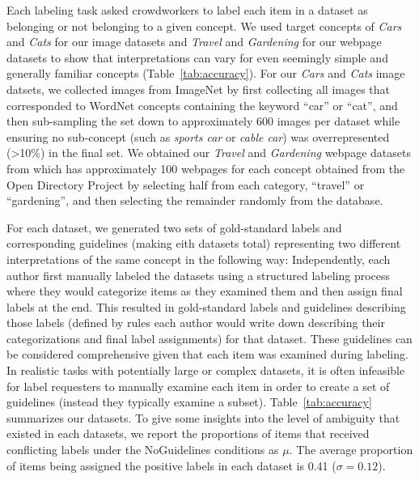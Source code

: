 Each labeling task asked crowdworkers to label each item in a dataset as belonging or not belonging to a given concept. We used target concepts of \emph{Cars} and \emph{Cats} for our image datasets and \emph{Travel} and \emph{Gardening} for our webpage datasets to show that interpretations can vary for even seemingly simple and generally familiar concepts (Table~\ref{tab:accuracy}). For our \emph{Cars} and \emph{Cats} image datsets, we collected images from ImageNet \cite{deng2009imagenet} by first collecting all images that corresponded to WordNet \cite{miller1995wordnet} concepts containing the keyword ``car'' or ``cat'', and then sub-sampling the set down to approximately 600 images per dataset while ensuring no sub-concept (such as \emph{sports car} or \emph{cable car}) was overrepresented (>10\%) in the final set. We obtained our \emph{Travel} and \emph{Gardening} webpage datasets from \cite{kulesza2014structured} which has approximately 100 webpages for each concept obtained from the Open Directory Project by selecting half from each category, ``travel'' or ``gardening'', and then selecting the remainder randomly from the database.

For each dataset, we generated two sets of gold-standard labels and corresponding guidelines (making eith datasets total) representing two different interpretations of the same concept in the following way: 
Independently, each author first manually labeled the datasets using a structured labeling process \cite{kulesza2014structured} where they would categorize items as they examined them and then assign final labels at the end. This resulted in gold-standard labels and guidelines describing those labels (defined by rules each author would write down describing their categorizations and final label assignments) for that dataset. These guidelines can be considered comprehensive given that each item was examined during labeling. In realistic tasks with potentially large or complex datasets, it is often infeasible for label requesters to manually examine each item in order to create a set of guidelines (instead they typically examine a subset). Table~\ref{tab:accuracy} summarizes our datasets. To give some insights into the level of ambiguity that existed in each datasets, we report the proportions of items that received conflicting labels under the NoGuidelines conditions as $\mu$. The average proportion of items being assigned the positive labels in each dataset is 0.41 ($\sigma=0.12$).  


